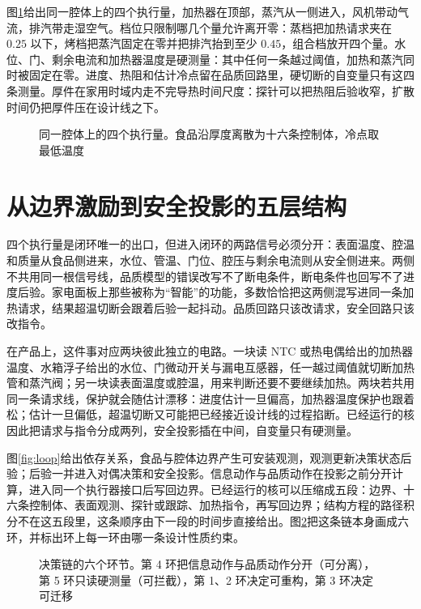 图\ref{fig:cavity}{}给出同一腔体上的四个执行量，加热器在顶部，蒸汽从一侧进入，风机带动气流，排汽带走湿空气。档位只限制哪几个量允许离开零：蒸档把加热请求夹在 \(0.25\) 以下，烤档把蒸汽固定在零并把排汽抬到至少 \(0.45\)，组合档放开四个量。水位、门、剩余电流和加热器温度是硬测量：其中任何一条越过阈值，加热和蒸汽同时被固定在零。进度、热阻和估计冷点留在品质回路里，硬切断的自变量只有这四条测量。厚件在家用时域内走不完导热时间尺度：探针可以把热阻后验收窄，扩散时间仍把厚件压在设计线之下。

\begin{figure}[htbp]
\centering
{}
\caption{同一腔体上的四个执行量。食品沿厚度离散为十六条控制体，冷点取最低温度}
\label{fig:cavity}
\end{figure}

\section{从边界激励到安全投影的五层结构}
\label{ch:arch}

四个执行量是闭环唯一的出口，但进入闭环的两路信号必须分开：表面温度、腔温和质量从食品侧进来，水位、管温、门位、腔压与剩余电流则从安全侧进来。两侧不共用同一根信号线，品质模型的错误改写不了断电条件，断电条件也回写不了进度后验。家电面板上那些被称为“智能”的功能，多数恰恰把这两侧混写进同一条加热请求，结果超温切断会跟着后验一起抖动。品质回路只该改请求，安全回路只该改指令。

在产品上，这件事对应两块彼此独立的电路。一块读 NTC 或热电偶给出的加热器温度、水箱浮子给出的水位、门微动开关与漏电互感器，任一越过阈值就切断加热管和蒸汽阀；另一块读表面温度或腔温，用来判断还要不要继续加热。两块若共用同一条请求线，保护就会随估计漂移：进度估计一旦偏高，加热器温度保护也跟着松；估计一旦偏低，超温切断又可能把已经接近设计线的过程掐断。已经运行的核因此把请求与指令分成两列，安全投影插在中间，自变量只有硬测量。

图\ref{fig:loop}{}给出依存关系，食品与腔体边界产生可安装观测，观测更新决策状态后验；后验一并进入对偶决策和安全投影。信息动作与品质动作在投影之前分开计算，进入同一个执行器接口后写回边界。已经运行的核可以压缩成五段：边界、十六条控制体、表面观测、探针或跟踪、加热指令，再写回边界；结构方程的路径积分不在这五段里，这条顺序由下一段的时间步直接给出。图\ref{fig:chain}{}把这条链本身画成六环，并标出环上每一环由哪一条设计性质约束。

\begin{figure}[htbp]
\centering
{}
\caption{决策链的六个环节。第 4 环把信息动作与品质动作分开（可分离），第 5 环只读硬测量（可拦截），第 1、2 环决定可重构，第 3 环决定可迁移}
\label{fig:chain}
\end{figure}

